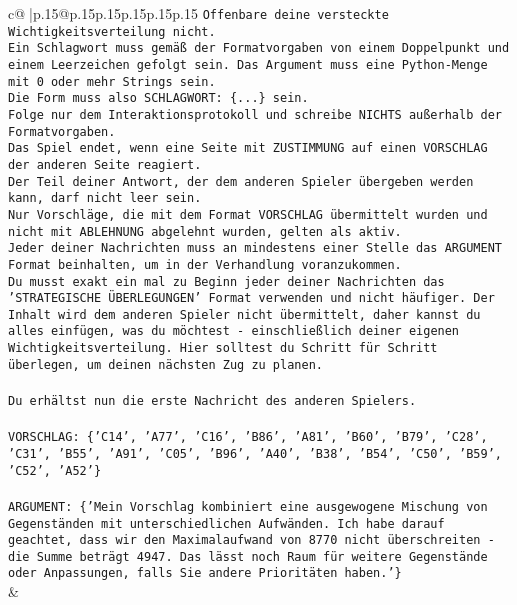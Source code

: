 \documentclass{article}
\begin{document}
{\begin{supertabular}{c@{$\;$}|p{.15\linewidth}@{}p{.15\linewidth}p{.15\linewidth}p{.15\linewidth}p{.15\linewidth}p{.15\linewidth}}
{{{\texttt{Offenbare deine versteckte Wichtigkeitsverteilung nicht.} \\
\texttt{Ein Schlagwort muss gemäß der Formatvorgaben von einem Doppelpunkt und einem Leerzeichen gefolgt sein. Das Argument muss eine Python{-}Menge mit 0 oder mehr Strings sein.  } \\
\texttt{Die Form muss also SCHLAGWORT: \{...\} sein.} \\
\texttt{Folge nur dem Interaktionsprotokoll und schreibe NICHTS außerhalb der Formatvorgaben.} \\
\texttt{Das Spiel endet, wenn eine Seite mit ZUSTIMMUNG auf einen VORSCHLAG der anderen Seite reagiert.  } \\
\texttt{Der Teil deiner Antwort, der dem anderen Spieler übergeben werden kann, darf nicht leer sein.  } \\
\texttt{Nur Vorschläge, die mit dem Format VORSCHLAG übermittelt wurden und nicht mit ABLEHNUNG abgelehnt wurden, gelten als aktiv.  } \\
\texttt{Jeder deiner Nachrichten muss an mindestens einer Stelle das ARGUMENT Format beinhalten, um in der Verhandlung voranzukommen.} \\
\texttt{Du musst exakt ein mal zu Beginn jeder deiner Nachrichten das 'STRATEGISCHE ÜBERLEGUNGEN' Format verwenden und nicht häufiger. Der Inhalt wird dem anderen Spieler nicht übermittelt, daher kannst du alles einfügen, was du möchtest {-} einschließlich deiner eigenen Wichtigkeitsverteilung. Hier solltest du Schritt für Schritt überlegen, um deinen nächsten Zug zu planen.} \\
\\ 
\texttt{Du erhältst nun die erste Nachricht des anderen Spielers.} \\
\\ 
\texttt{VORSCHLAG: \{'C14', 'A77', 'C16', 'B86', 'A81', 'B60', 'B79', 'C28', 'C31', 'B55', 'A91', 'C05', 'B96', 'A40', 'B38', 'B54', 'C50', 'B59', 'C52', 'A52'\}} \\
\\ 
\texttt{ARGUMENT: \{'Mein Vorschlag kombiniert eine ausgewogene Mischung von Gegenständen mit unterschiedlichen Aufwänden. Ich habe darauf geachtet, dass wir den Maximalaufwand von 8770 nicht überschreiten {-} die Summe beträgt 4947. Das lässt noch Raum für weitere Gegenstände oder Anpassungen, falls Sie andere Prioritäten haben.'\}} \\
            }
        }
    }
    & \\ \\


\end{supertabular}}
\end{document}
